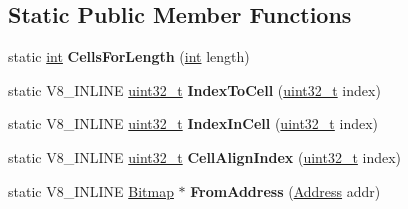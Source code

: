 \subsection*{Static Public Member Functions}
\begin{DoxyCompactItemize}
\item 
\mbox{\label{classv8_1_1internal_1_1Bitmap_ad66f6785ba1628091c2b57b00b039d28}} 
static \mbox{\hyperlink{classint}{int}} {\bfseries Cells\+For\+Length} (\mbox{\hyperlink{classint}{int}} length)
\item 
\mbox{\label{classv8_1_1internal_1_1Bitmap_ad30238eed8d255dfa43bbb26ae82c5c3}} 
static V8\+\_\+\+I\+N\+L\+I\+NE \mbox{\hyperlink{classuint32__t}{uint32\+\_\+t}} {\bfseries Index\+To\+Cell} (\mbox{\hyperlink{classuint32__t}{uint32\+\_\+t}} index)
\item 
\mbox{\label{classv8_1_1internal_1_1Bitmap_aa252ce8d3b20887e35681a1b299d58db}} 
static V8\+\_\+\+I\+N\+L\+I\+NE \mbox{\hyperlink{classuint32__t}{uint32\+\_\+t}} {\bfseries Index\+In\+Cell} (\mbox{\hyperlink{classuint32__t}{uint32\+\_\+t}} index)
\item 
\mbox{\label{classv8_1_1internal_1_1Bitmap_a69757951247cf9915bcad089df14c0a0}} 
static V8\+\_\+\+I\+N\+L\+I\+NE \mbox{\hyperlink{classuint32__t}{uint32\+\_\+t}} {\bfseries Cell\+Align\+Index} (\mbox{\hyperlink{classuint32__t}{uint32\+\_\+t}} index)
\item 
\mbox{\label{classv8_1_1internal_1_1Bitmap_a82bf7909d4127553799315e190756a85}} 
static V8\+\_\+\+I\+N\+L\+I\+NE \mbox{\hyperlink{classv8_1_1internal_1_1Bitmap}{Bitmap}} $\ast$ {\bfseries From\+Address} (\mbox{\hyperlink{classuintptr__t}{Address}} addr)
\end{DoxyCompactItemize}
